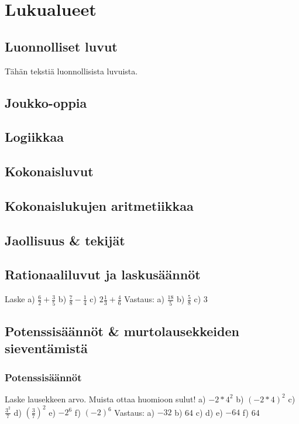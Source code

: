 


\part{Lukualueet}
\chapter{Luonnolliset luvut}

Tähän tekstiä luonnollisista luvuista.

\chapter{Joukko-oppia}
\chapter{Logiikkaa}
\chapter{Kokonaisluvut}
\chapter{Kokonaislukujen aritmetiikkaa}
\chapter{Jaollisuus \& tekijät}
\chapter{Rationaaliluvut ja laskusäännöt}

Laske %
a) $\frac{6}{2} + \frac{3}{5}$
b) $\frac{7}{8} - \frac{1}{4}$
c) $2 \frac{1}{3} + \frac{4}{6}$
Vastaus:
a) $\frac{18}{5}$
b) $\frac{5}{8}$
c) $3$

\chapter{Potenssisäännöt \& murtolausekkeiden sieventämistä}

\section{Potenssisäännöt}

Laske lausekkeen arvo. Muista ottaa huomioon sulut!
a) $-2*4^2$
b) $(-2*4)^2$
c) $\frac{3^2}{7}$
d) $\left( \frac{3}{7} \right)^2$
e) $-2^6$
f) $(-2)^6$
Vastaus:
a) $-32$
b) 64
c) 
d) 
e) $-64$
f) 64


